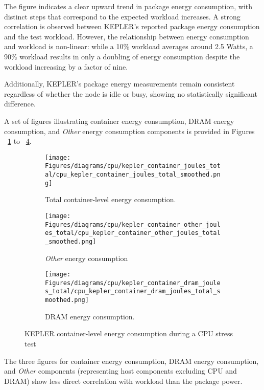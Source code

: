     The figure indicates a clear upward trend in package energy consumption, with distinct steps that correspond to the expected workload increases. A strong correlation is observed between KEPLER's reported package energy consumption and the test workload. However, the relationship between energy consumption and workload is non-linear: while a 10\% workload averages around 2.5 Watts, a 90\% workload results in only a doubling of energy consumption despite the workload increasing by a factor of nine.
    
Additionally, KEPLER's package energy measurements remain consistent regardless of whether the node is idle or busy, showing no statistically significant difference.

A set of figures illustrating container energy consumption, DRAM energy consumption, and \textit{Other} energy consumption components is provided in Figures ~\ref{fig:cpu_kepler_container_joules_total} to ~\ref{fig:cpu_kepler_container_dram_joules_total}.

\begin{figure}[H]
    \centering
    \begin{subfigure}{1\textwidth}
        \texttt{[image: Figures/diagrams/cpu/kepler\_container\_joules\_total/cpu\_kepler\_container\_joules\_total\_smoothed.png]}
        \caption{Total container-level energy consumption.}
        \label{fig:cpu_kepler_container_joules_total}
    \end{subfigure}
    \begin{subfigure}{0.49\textwidth}
        \texttt{[image: Figures/diagrams/cpu/kepler\_container\_other\_joules\_total/cpu\_kepler\_container\_other\_joules\_total\_smoothed.png]}
        \caption{\textit{Other} energy consumption}
        \label{fig:cpu_kepler_container_other_joules_total}
    \end{subfigure}
    \begin{subfigure}{0.49\textwidth}
        \texttt{[image: Figures/diagrams/cpu/kepler\_container\_dram\_joules\_total/cpu\_kepler\_container\_dram\_joules\_total\_smoothed.png]}
        \caption{DRAM energy consumption.}
        \label{fig:cpu_kepler_container_dram_joules_total}
    \end{subfigure}
    \caption[Container-Level Energy Consumption]{KEPLER container-level energy consumption during a CPU stress test}
\end{figure}

The three figures for container energy consumption, DRAM energy consumption, and \textit{Other} components (representing host components excluding CPU and DRAM) show less direct correlation with workload than the package power. 


